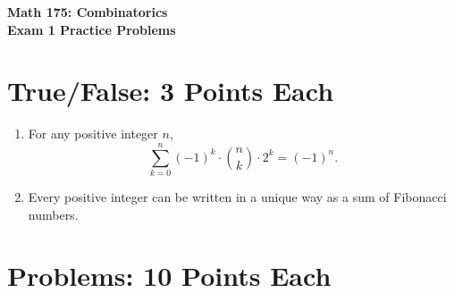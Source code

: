 \documentclass[11pt]{article}
\begin{document}
\begin{center}
{\Large \bf Math 175: Combinatorics} \\
{\large \bf Exam 1 Practice Problems}
\end{center}




\section{True/False: 3 Points Each}

\begin{enumerate} 

\item For any positive integer $n$,
\[
\sum_{k=0}^n (-1)^k \cdot \binom{n}{k} \cdot 2^{k} = (-1)^n.
\]

\item Every positive integer can be written in a unique way as a sum of Fibonacci numbers.

\end{enumerate}

\section{Problems: 10 Points Each}
\end{document}
